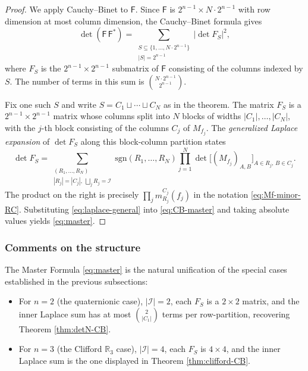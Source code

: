 \documentclass[11pt]{amsart}
\begin{document}
\begin{proof}
We apply Cauchy--Binet to $\mathsf{F}$. Since $\mathsf{F}$ is $2^{n-1} \times N\cdot 2^{n-1}$ with row dimension at most column dimension, the Cauchy--Binet formula gives
\begin{equation}\label{eq:CB-master}
\det(\mathsf{F}\,\mathsf{F}^{\ast}) = \sum_{\substack{S \subseteq \{1,\ldots,N\cdot 2^{n-1}\}\\ |S| = 2^{n-1}}} |\det F_S|^2,
\end{equation}
where $F_S$ is the $2^{n-1}\times 2^{n-1}$ submatrix of $\mathsf{F}$ consisting of the columns indexed by $S$. The number of terms in this sum is $\binom{N\cdot 2^{n-1}}{2^{n-1}}$.

Fix one such $S$ and write $S = C_1 \sqcup \cdots \sqcup C_N$ as in the theorem. The matrix $F_S$ is a $2^{n-1}\times 2^{n-1}$ matrix whose columns split into $N$ blocks of widths $|C_1|, \ldots, |C_N|$, with the $j$-th block consisting of the columns $C_j$ of $M_{f_j}$. The \emph{generalized Laplace expansion} of $\det F_S$ along this block-column partition states
\begin{equation}\label{eq:laplace-general}
\det F_S = \sum_{\substack{(R_1, \ldots, R_N)\\ |R_j| = |C_j|,\ \bigsqcup_j R_j = \mathcal I}} \mathrm{sgn}(R_1, \ldots, R_N) \prod_{j=1}^{N} \det\bigl[(M_{f_j})_{A,B}\bigr]_{A \in R_j,\, B \in C_j}.
\end{equation}
The product on the right is precisely $\prod_j m_{R_j}^{C_j}(f_j)$ in the notation \eqref{eq:Mf-minor-RC}. Substituting \eqref{eq:laplace-general} into \eqref{eq:CB-master} and taking absolute values yields \eqref{eq:master}.
\end{proof}

\subsubsection{Comments on the structure}

The Master Formula \eqref{eq:master} is the natural unification of the special cases established in the previous subsections:
\begin{itemize}
\item For $n=2$ (the quaternionic case), $|\mathcal I| = 2$, each $F_S$ is a $2\times 2$ matrix, and the inner Laplace sum has at most $\binom{2}{|C_1|}$ terms per row-partition, recovering Theorem \ref{thm:detN-CB}.
\item For $n=3$ (the Clifford $\mathbb{R}_3$ case), $|\mathcal I| = 4$, each $F_S$ is $4\times 4$, and the inner Laplace sum is the one displayed in Theorem \ref{thm:clifford-CB}.
\end{itemize}
\end{document}
